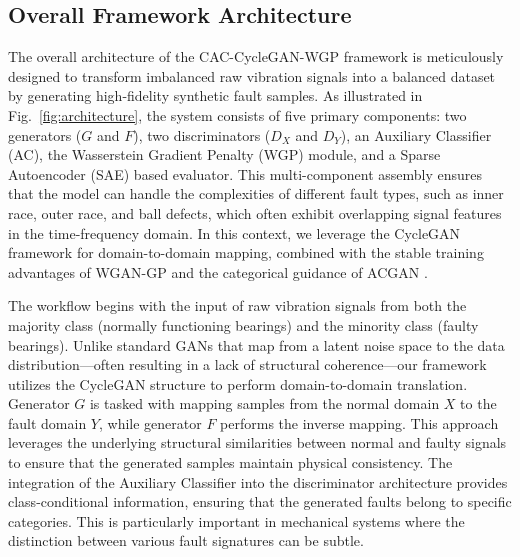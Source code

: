 \documentclass[conference,twocolumn]{IEEEtran}
\begin{document}
\subsection{Overall Framework Architecture}
\label{subsec:framework}

The overall architecture of the CAC-CycleGAN-WGP framework is meticulously designed to transform imbalanced raw vibration signals into a balanced dataset by generating high-fidelity synthetic fault samples. As illustrated in  Fig.~\ref{fig:architecture}, the system consists of five primary components: two generators ($G$ and $F$), two discriminators ($D_X$ and $D_Y$), an Auxiliary Classifier (AC), the Wasserstein Gradient Penalty (WGP) module, and a Sparse Autoencoder (SAE) based evaluator. This multi-component assembly ensures that the model can handle the complexities of different fault types, such as inner race, outer race, and ball defects, which often exhibit overlapping signal features in the time-frequency domain. In this context, we leverage the CycleGAN \cite{4} framework for domain-to-domain mapping, combined with the stable training advantages of WGAN-GP \cite{3} and the categorical guidance of ACGAN \cite{5}.

The workflow begins with the input of raw vibration signals from both the majority class (normally functioning bearings) and the minority class (faulty bearings). Unlike standard GANs that map from a latent noise space to the data distribution—often resulting in a lack of structural coherence—our framework utilizes the CycleGAN structure to perform domain-to-domain translation. Generator $G$ is tasked with mapping samples from the normal domain $X$ to the fault domain $Y$, while generator $F$ performs the inverse mapping. This approach leverages the underlying structural similarities between normal and faulty signals to ensure that the generated samples maintain physical consistency. The integration of the Auxiliary Classifier into the discriminator architecture provides class-conditional information, ensuring that the generated faults belong to specific categories. This is particularly important in mechanical systems where the distinction between various fault signatures can be subtle.
\end{document}

